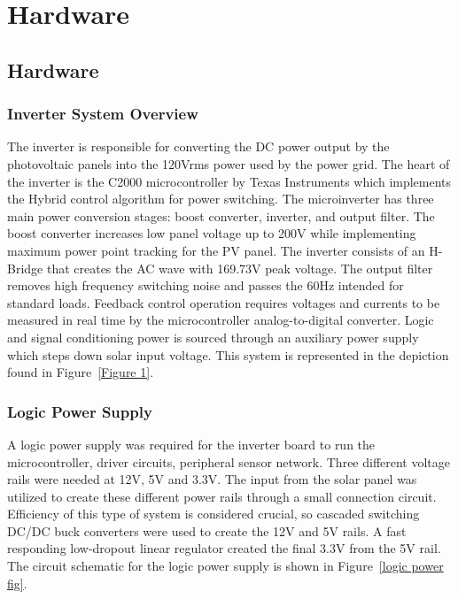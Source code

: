 
\chapter{Hardware} %

\label{Chapter2} %



\section{Hardware}

\subsection{Inverter System Overview}

The inverter is responsible for converting the DC power output by the photovoltaic panels into the 120Vrms power used by the power grid. The heart of the inverter is the C2000 microcontroller by Texas Instruments which implements the Hybrid control algorithm for power switching. The microinverter has three main power conversion stages: boost converter, inverter, and output filter. The boost converter increases low panel voltage up to 200V while implementing maximum power point tracking for the PV panel. The inverter consists of an H-Bridge that creates the AC wave with 169.73V peak voltage. The output filter removes high frequency switching noise and passes the 60Hz intended for standard loads.  Feedback control operation requires voltages and currents to be measured in real time by the microcontroller analog-to-digital converter. Logic and signal conditioning power is sourced through an auxiliary power supply which steps down solar input voltage. This system is represented in the depiction found in Figure~\ref{Figure 1}.   

\subsection{Logic Power Supply}
A logic power supply was required for the inverter board to run the microcontroller, driver circuits, peripheral sensor network. Three different voltage rails were needed at 12V, 5V and 3.3V. The input from the solar panel was utilized to create these different power rails through a small connection circuit. Efficiency of this type of system is considered crucial, so cascaded switching DC/DC buck converters were used to create the 12V and 5V rails. A fast responding low-dropout linear regulator created the final 3.3V from the 5V rail. The circuit schematic for the logic power supply is shown in Figure~\ref{logic power fig}.

